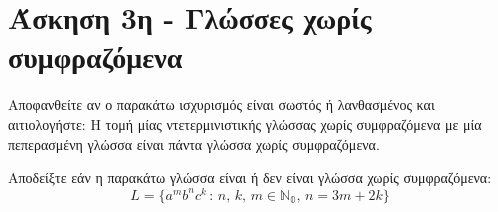 \section{Άσκηση 3η - Γλώσσες χωρίς συμφραζόμενα}
\label{sec:Exercise_3}
\doublespacing

\bm{\textcolor{blue}{(α) [5\%]}} Αποφανθείτε αν ο παρακάτω ισχυρισμός είναι σωστός ή λανθασμένος και αιτιολογήστε:
Η τομή μίας ντετερμινιστικής γλώσσας χωρίς συμφραζόμενα με μία πεπερασμένη γλώσσα είναι πάντα γλώσσα χωρίς
συμφραζόμενα.

\bm{\textcolor{blue}{(β) [5\%]}} Αποδείξτε εάν η παρακάτω γλώσσα είναι ή δεν είναι γλώσσα χωρίς συμφραζόμενα:\\
\[L = \{a^mb^nc^k\,:\,n,\,k,\,m\in\mathbb{N_0},\, n=3m+2k\}\]




\hfill \break


\clearpage